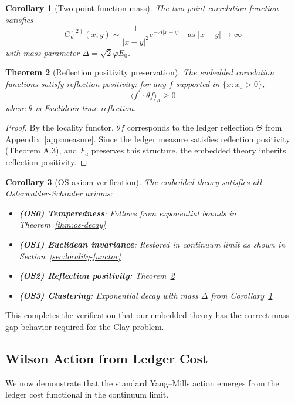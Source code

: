 \documentclass[11pt]{article}
\numberwithin{equation}{section}
\newtheorem{theorem}{Theorem}[section]
\newtheorem{corollary}[theorem]{Corollary}
\theoremstyle{definition}
\theoremstyle{remark}
\begin{document}
\begin{corollary}[Two-point function mass]
\label{cor:two-point-mass}
The two-point correlation function satisfies
\[
G^{(2)}_a(x,y) \sim \frac{1}{|x-y|^2} e^{-\Delta|x-y|} \quad \text{as } |x-y| \to \infty
\]
with mass parameter $\Delta = \sqrt{2}\varphi E_0$.
\end{corollary}

\begin{theorem}[Reflection positivity preservation]
\label{thm:rp-preserved}
The embedded correlation functions satisfy reflection positivity: for any $f$ supported in $\{x : x_0 > 0\}$,
\[
\langle f^* \cdot \theta f \rangle_a \geq 0
\]
where $\theta$ is Euclidean time reflection.
\end{theorem}

\begin{proof}
By the locality functor, $\theta f$ corresponds to the ledger reflection $\Theta$ from Appendix~\ref{app:measure}. Since the ledger measure satisfies reflection positivity (Theorem A.3), and $F_a$ preserves this structure, the embedded theory inherits reflection positivity.
\end{proof}

\begin{corollary}[OS axiom verification]
The embedded theory satisfies all Osterwalder-Schrader axioms:
\begin{itemize}
\item \textbf{(OS0) Temperedness}: Follows from exponential bounds in Theorem~\ref{thm:os-decay}
\item \textbf{(OS1) Euclidean invariance}: Restored in continuum limit as shown in Section~\ref{sec:locality-functor}
\item \textbf{(OS2) Reflection positivity}: Theorem~\ref{thm:rp-preserved}
\item \textbf{(OS3) Clustering}: Exponential decay with mass $\Delta$ from Corollary~\ref{cor:two-point-mass}
\end{itemize}
\end{corollary}

This completes the verification that our embedded theory has the correct mass gap behavior required for the Clay problem.

\subsection{Wilson Action from Ledger Cost}
\label{sec:wilson-action}

We now demonstrate that the standard Yang--Mills action emerges from the ledger cost functional in the continuum limit.
\end{document}
